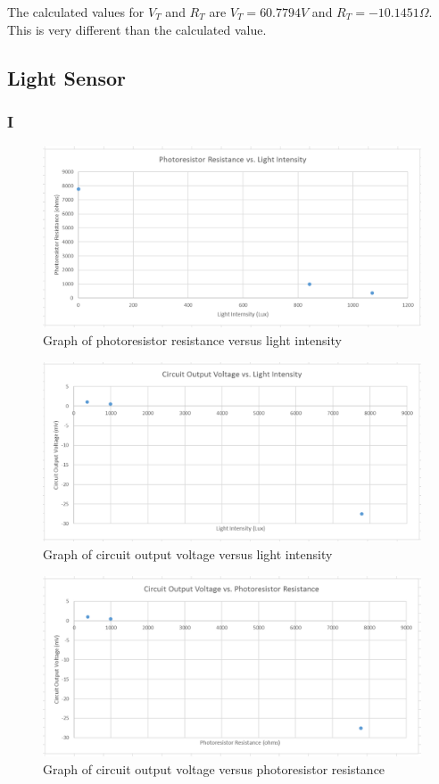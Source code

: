 \documentclass[10pt]{article}
\begin{document}
The calculated values for \(V_T\) and \(R_T\) are \(V_T = 60.7794V\) and \(R_T = -10.1451\Omega\). This is very different than the calculated value.

\subsection*{Light Sensor}
\subsubsection*{I}
\begin{figure}[H]
	\centering
	\includegraphics[width=\textwidth]{LSA}
	\caption{Graph of photoresistor resistance versus light intensity}
\end{figure}
\begin{figure}[H]
	\centering
	\includegraphics[width=\textwidth]{LSB}
	\caption{Graph of circuit output voltage versus light intensity}
\end{figure}
\begin{figure}[H]
	\centering
	\includegraphics[width=\textwidth]{LSC}
	\caption{Graph of circuit output voltage versus photoresistor resistance}
\end{figure}
\end{document}
